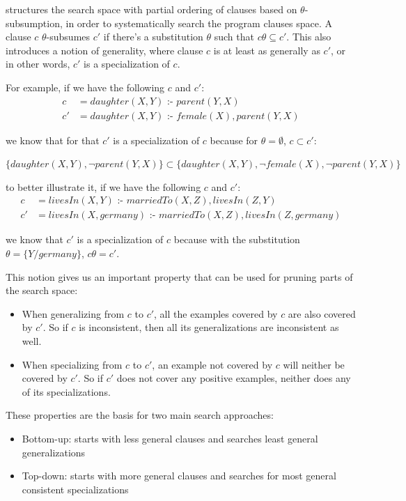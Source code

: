 \citet{DBLP:journals/ml/LavracD96} structures the search space with partial ordering of clauses based on
$\theta$-subsumption, in order to systematically search the program clauses space. A clause $c$ $\theta$-subsumes $c'$
if there's a substitution $\theta$ such that $c\theta \subseteq c'$. This also introduces a notion of generality,
where clause $c$ is at least as generally as $c'$, or in other words, $c'$ is a specialization of $c$.

For example, if we have the following $c$ and $c'$:
\begin{align*}
  c &= daughter(X,Y) \text{ :- } parent(Y,X) \\
  c'&= daughter(X,Y )\text{ :- } female(X),parent(Y,X)
\end{align*}

we know that for that $c'$ is a specialization of $c$ because for $\theta=\emptyset$, $c \subset c'$:
\begin{center}
$\{daughter(X,Y),\neg parent(Y,X)\} \subset \{daughter(X,Y),\neg female(X),\neg parent(Y,X)\}$ 
\end{center}

to better illustrate it, if we have the following $c$ and $c'$:
\begin{align*}
  c &= livesIn(X,Y) \text{ :- } marriedTo(X,Z),livesIn(Z,Y)\\
  c'&=livesIn(X,germany) \text{ :- } marriedTo(X,Z),livesIn(Z,germany)
\end{align*}

we know that $c'$ is a specialization of $c$ because with the substitution $\theta=\{Y/germany\}$, $c\theta=c'$.

This notion gives us an important property that can be used for pruning parts of the search space:

\begin{itemize}
 \item When generalizing from $c$ to $c'$, all the examples covered by $c$ are also covered by $c'$. So if $c$ is
inconsistent, then all its generalizations are inconsistent as well.
  \item When specializing from $c$ to $c'$, an example not covered by $c$ will neither be covered by $c'$. So if $c'$
does not cover any positive examples, neither does any of its specializations.
\end{itemize}

These properties are the basis for two main search approaches:

\begin{itemize}
 \item Bottom-up: starts with less general clauses and searches least general generalizations
 \item Top-down: starts with more general clauses and searches for most general consistent specializations
\end{itemize}


